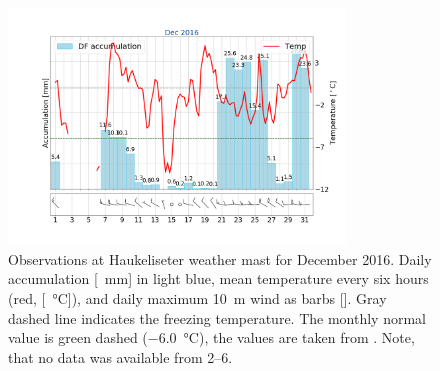 \begin{figure}[t]
	\centering
	\includegraphics[trim={4.cm 3.3cm 1.5cm 3.cm},clip,
	width=0.8\textwidth]{./fig_weathermast/T_P_U_201612}
	\caption{Observations at Haukeliseter weather mast for December 2016. Daily accumulation [\SI{}{\mm}] in light blue, mean temperature every six hours (red, [\SI{}{\celsius}]), and daily maximum \SI{10}{\metre} wind as barbs [\SI{}{\mPs}]. Gray dashed line indicates the freezing temperature. The monthly normal value is green dashed (\SI{-6.0}{\celsius}), the values are taken from \cite{eklima_norwegian_2016}. Note, that no data was available from \SIrange{2}{6}{\dec}.} \label{fig:DecObs}
\end{figure}